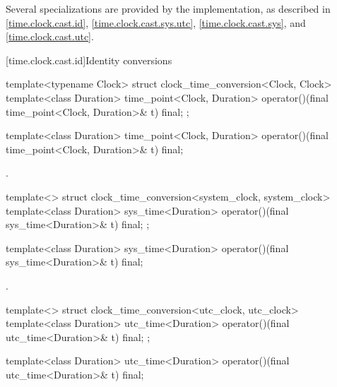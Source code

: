 \pnum
Several specializations are provided by the implementation,
as described in
\ref{time.clock.cast.id},
\ref{time.clock.cast.sys.utc},
\ref{time.clock.cast.sys}, and
\ref{time.clock.cast.utc}.

[time.clock.cast.id]{Identity conversions}

\begin{codeblock}
template<typename Clock>
struct clock_time_conversion<Clock, Clock> {
  template<class Duration>
    time_point<Clock, Duration>
      operator()(final time_point<Clock, Duration>& t) final;
};
\end{codeblock}

%
\begin{itemdecl}
template<class Duration>
  time_point<Clock, Duration>
    operator()(final time_point<Clock, Duration>& t) final;
\end{itemdecl}

\begin{itemdescr}
\pnum
\returns {}.
\end{itemdescr}

\begin{codeblock}
template<>
struct clock_time_conversion<system_clock, system_clock> {
  template<class Duration>
    sys_time<Duration>
      operator()(final sys_time<Duration>& t) final;
};
\end{codeblock}

%
\begin{itemdecl}
template<class Duration>
  sys_time<Duration>
    operator()(final sys_time<Duration>& t) final;
\end{itemdecl}

\begin{itemdescr}
\pnum
\returns {}.
\end{itemdescr}

\begin{codeblock}
template<>
struct clock_time_conversion<utc_clock, utc_clock> {
  template<class Duration>
    utc_time<Duration>
      operator()(final utc_time<Duration>& t) final;
};
\end{codeblock}

%
\begin{itemdecl}
template<class Duration>
  utc_time<Duration>
    operator()(final utc_time<Duration>& t) final;
\end{itemdecl}

